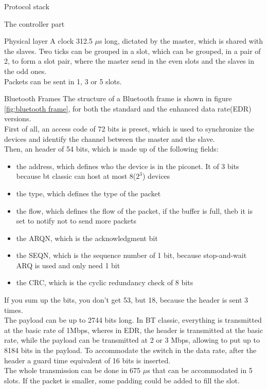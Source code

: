 \begin{section}{Protocol stack}
\begin{subsection}{The controller part}
\begin{subsubsection}{Physical layer}
    A clock 312.5 $\mu$s long, dictated by the master, which is shared with the slaves.
    Two ticks can be grouped in a slot, which can be grouped, in a pair of 2, to form a slot pair,
    where the master send in the even slots and the slaves in the odd ones.\\
    Packets can be sent in 1, 3 or 5 slots.

    \end{subsubsection}

  \end{subsection}
\end{section}

\begin{section}{Bluetooth Frames}
  The structure of a Bluetooth frame is shown in figure \ref{fig:bluetooth frame}, for both 
  the standard and the enhanced data rate(EDR) versions.\\
  First of all, an access code of 72 bits is preset, which is used to synchronize the devices and
  identify the channel between the master and the slave.\\
  Then, an header of 54 bits, which is made up of the following fields:
  \begin{itemize}
    \item the address, which defines who the device is in the piconet. It of 3 bits because bt
      classic can host at most 8($2^3$) devices
    \item the type, which defines the type of the packet
    \item the flow, which defines the flow of the packet, if the buffer is full, theb it is set to
      notify not to send more packets
    \item the ARQN, which is the acknowledgment bit 
    \item the SEQN, which is the sequence number of 1 bit, because stop-and-wait ARQ is used and
      only need 1 bit
    \item the CRC, which is the cyclic redundancy check of 8 bits
  \end{itemize}
  If you sum up the bits, you don't get 53, but 18, because the header is sent 3 times.\\
  The payload can be up to 2744 bits long. In BT classic, everything is transmitted at the basic
  rate of 1Mbps, wheres in EDR, the header is transmitted at the basic rate, while the payload can 
  be transmitted at 2 or 3 Mbps, allowing to put up to 8184 bits in the payload. To accommodate the
  switch in the data rate, after the header a guard time equivalent of 16 bits is inserted.\\
  The whole transmission can be done in 675 $\mu$s that can be accommodated in 5 slots. If the
  packet is smaller, some padding could be added to fill the slot.\\


\end{section}
